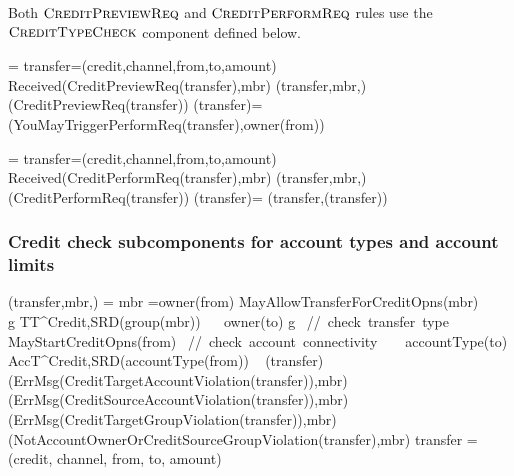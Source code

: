  Both $\hbox{\sc CreditPreviewReq}$ and $ \hbox{\sc CreditPerformReq}$ rules use the $ \hbox{\sc CreditTypeCheck}$ component defined below.
 
 \begin{asm}
  =\+
    \LET transfer=(credit,channel,from,to,amount)\+
        \IF Received(CreditPreviewReq(transfer),\FROM mbr) \THEN \+   
           (transfer,mbr,)\\
            (CreditPreviewReq(transfer)) \dec\dec\-
      \WHERE \+
         (transfer)=\+
        (YouMayTriggerPerformReq(transfer),\TO owner(from))
 \end{asm}
 
 
 \begin{asm}
  =\+
 \LET transfer=(credit,channel,from,to,amount)\\
 \IF Received(CreditPerformReq(transfer),\FROM mbr) \THEN \+  
 (transfer,mbr,)\\
 (CreditPerformReq(transfer))\dec\-
 \WHERE \+
 (transfer)=\+
 (transfer,(transfer))
 \end{asm}
 
 \subsubsection{Credit check subcomponents for account types and account limits} 
 
 \begin{asm}
 	(transfer,mbr,)  =\+
 	\IF mbr =owner(from) \AND MayAllowTransferForCreditOpns(mbr) \+
 	\THEN ~ \IF ~ \FORSOME g \in TT^{Credit,SRD}(group(mbr)) 
 	~~ owner(to) \in g   \mbox{  // check transfer type}\+
 	\THEN  ~ \IF MayStartCreditOpns(from) 
 	\mbox{  // check account connectivity}\+
 	\THEN ~ \IF ~ accountType(to) \in 
 	AccT^{Credit,SRD}(accountType(from))\+
 	\THEN ~ (transfer) \-
 	\ELSE ~ (ErrMsg(CreditTargetAccountViolation(transfer)),\TO mbr) \-
 	\ELSE ~ (ErrMsg(CreditSourceAccountViolation(transfer)),\TO mbr)\-
 	\ELSE ~ (ErrMsg(CreditTargetGroupViolation(transfer)),\TO mbr) \- 
 	\ELSE ~  (NotAccountOwnerOrCreditSourceGroupViolation(transfer),\TO mbr)\-
 	\WHERE \+
 	transfer = (credit, channel, from, to, amount)   
 \end{asm}
 

